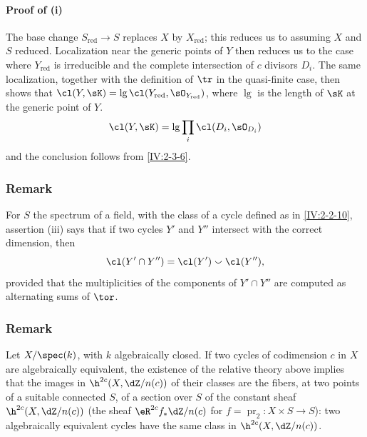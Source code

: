 \paragraph{Proof of (i)}
The base change $S_\text{red}\to S$ replaces $X$ by $X_\text{red}$; this
reduces us to assuming $X$ and $S$ reduced. Localization near the generic
points of $Y$ then reduces us to the case where $Y_\text{red}$ is irreducible
and the complete intersection of $c$ divisors $D_i$. The same localization,
together with the definition of $\tr$ in the quasi-finite case, then shows
that
$\cl(Y,\sK)=\operatorname{lg}\cl(Y_\text{red},\sO_{Y_\text{red}})$, where
$\operatorname{lg}$ is the length of $\sK$ at the generic point of $Y$.
\[
  \cl(Y,\sK) = \operatorname{lg} \prod_i \cl(D_i,\sO_{D_i})
\]
and the conclusion follows from \ref{IV:2-3-6}.






\subsubsection{Remark}\label{IV:2-3-9}

For $S$ the spectrum of a field, with the class of a cycle defined as in
\ref{IV:2-2-10}, assertion (iii) says that if two cycles $Y'$ and $Y''$
intersect with the correct dimension, then
\[
  \cl(Y'\cap Y'') = \cl(Y')\smallsmile \cl(Y'')\text{,}
\]
provided that the multiplicities of the components of $Y'\cap Y''$ are
computed as alternating sums of $\tor$.






\subsubsection{Remark}\label{IV:2-3-10}

Let $X/\spec(k)$, with $k$ algebraically closed. If two cycles of codimension
$c$ in $X$ are algebraically equivalent, the existence of the relative
theory above implies that the images in $\h^{2 c}(X,\dZ/n(c))$ of their
classes are the fibers, at two points of a suitable connected $S$, of a
section over $S$ of the constant sheaf $\h^{2 c}(X,\dZ/n(c))$ (the sheaf
$\eR^{2 c} f_\ast \dZ/n(c)$ for
$f=\operatorname{pr}_2:X\times S\to S$): two algebraically equivalent cycles
have the same class in $\h^{2 c}(X,\dZ/n(c))$.





















